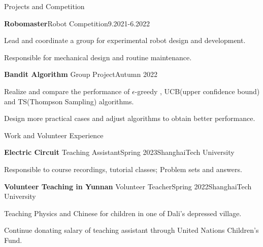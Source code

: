 \documentclass[]{ZhongtaoGuan_CV}
\begin{document}
\begin{section}{Projects and Competition}
 \begin{subsection}{\textbf{Robomaster}}{Robot Competition}{9.2021-6.2022}{}
     \item{Lead and coordinate a group for experimental robot design and development.}
     \item{Responsible for mechanical design and routine maintenance.}

 \end{subsection}

 \begin{subsection}{\textbf{Bandit Algorithm}}
     {Group Project}{Autumn 2022}{}
     \item{Realize and compare the performance of $\epsilon$-greedy , UCB(upper confidence bound) and TS(Thompson Sampling) algorithms.}
     \item{ Design more practical cases and adjust algorithms to obtain better performance.}
 \end{subsection}
\end{section}


\begin{section}{Work and Volunteer Experience}
 \begin{subsection}{\textbf{Electric Circuit}}
     {Teaching Assistant}{Spring 2023}{ShanghaiTech University}
     \item{Responsible to course recordings, tutorial classes; Problem sets and answers.}
 \end{subsection}
 \begin{subsection}{\textbf{Volunteer Teaching in Yunnan}}
     {Volunteer Teacher}{Spring 2022}{ShanghaiTech University}
     \item{Teaching Physics and Chinese for children in one of Dali's depressed village.}
     \item{Continue donating salary of teaching assistant through United Nations Children's Fund.}
 \end{subsection}
\end{section}

\end{document}
